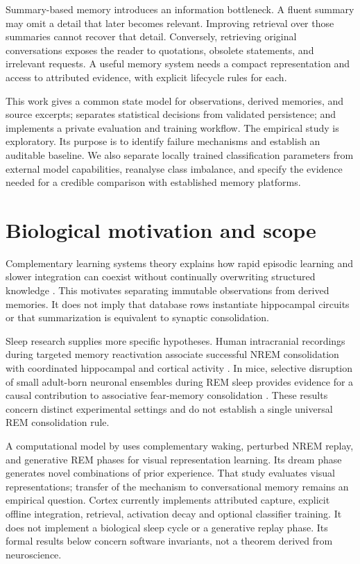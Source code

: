 \documentclass[11pt]{article}
\begin{document}
Summary-based memory introduces an information bottleneck. A fluent summary may omit a detail that later becomes relevant. Improving retrieval over those summaries cannot recover that detail. Conversely, retrieving original conversations exposes the reader to quotations, obsolete statements, and irrelevant requests. A useful memory system needs a compact representation and access to attributed evidence, with explicit lifecycle rules for each.

This work gives a common state model for observations, derived memories, and source excerpts; separates statistical decisions from validated persistence; and implements a private evaluation and training workflow. The empirical study is exploratory. Its purpose is to identify failure mechanisms and establish an auditable baseline. We also separate locally trained classification parameters from external model capabilities, reanalyse class imbalance, and specify the evidence needed for a credible comparison with established memory platforms.

\section{Biological motivation and scope}
Complementary learning systems theory explains how rapid episodic learning and slower integration can coexist without continually overwriting structured knowledge \citep{cls}. This motivates separating immutable observations from derived memories. It does not imply that database rows instantiate hippocampal circuits or that summarization is equivalent to synaptic consolidation.

Sleep research supplies more specific hypotheses. Human intracranial recordings during targeted memory reactivation associate successful NREM consolidation with coordinated hippocampal and cortical activity \citep{nrem2025}. In mice, selective disruption of small adult-born neuronal ensembles during REM sleep provides evidence for a causal contribution to associative fear-memory consolidation \citep{rem2025}. These results concern distinct experimental settings and do not establish a single universal REM consolidation rule.

A computational model by \citet{dreaming} uses complementary waking, perturbed NREM replay, and generative REM phases for visual representation learning. Its dream phase generates novel combinations of prior experience. That study evaluates visual representations; transfer of the mechanism to conversational memory remains an empirical question. Cortex currently implements attributed capture, explicit offline integration, retrieval, activation decay and optional classifier training. It does not implement a biological sleep cycle or a generative replay phase. Its formal results below concern software invariants, not a theorem derived from neuroscience.
\end{document}
